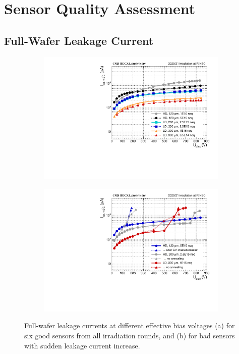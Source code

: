 \section{Sensor Quality Assessment}
\label{sec:QA}

\subsection{Full-Wafer Leakage Current}
\label{subsec:QA_Itot}

\begin{figure}
	\captionsetup[subfigure]{aboveskip=-1pt,belowskip=-1pt}
	\centering
	\begin{subfigure}[b]{0.49\textwidth}
		\includegraphics[width=0.999\textwidth]{plots/total_iv/total_current_IV.pdf}
		\subcaption{
		}
		\label{plot:tot_IV_good}
	\end{subfigure}
	\hfill
	\begin{subfigure}[b]{0.49\textwidth}
		\includegraphics[width=0.999\textwidth]{plots/total_iv/total_current_IV_bad.pdf}
		\subcaption{
		}
		\label{plot:tot_IV_bad}
	\end{subfigure}
	\caption{
		Full-wafer leakage currents at different effective bias voltages (a) for six good sensors from all irradiation rounds, and (b) for bad sensors with sudden leakage current increase.
	}
\end{figure}


